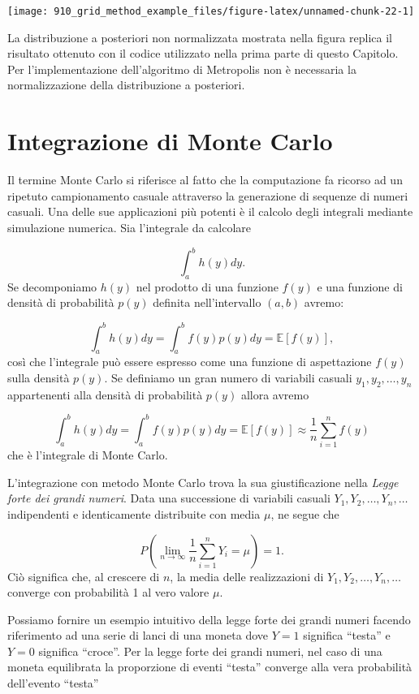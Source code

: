 \documentclass[
]{memoir}
\newcommand{\E}{\mathbb{E}} %
\begin{document}
\begin{center}\texttt{[image: 910\_grid\_method\_example\_files/figure-latex/unnamed-chunk-22-1]} \end{center}

\noindent
La distribuzione a posteriori non normalizzata mostrata nella figura replica il risultato ottenuto con il codice utilizzato nella prima parte di questo Capitolo. Per l'implementazione dell'algoritmo di Metropolis non è necessaria la normalizzazione della distribuzione a posteriori.

\hypertarget{integration-mc}{%
\chapter{Integrazione di Monte Carlo}\label{integration-mc}}

Il termine Monte Carlo si riferisce al fatto che la computazione fa ricorso ad un ripetuto campionamento casuale attraverso la generazione di sequenze di numeri casuali. Una delle sue applicazioni più potenti è il calcolo degli integrali mediante simulazione numerica. Sia l'integrale da calcolare

\[
\int_a^b h(y) dy.
\]
Se decomponiamo \(h(y)\) nel prodotto di una funzione \(f(y)\) e una funzione di densità
di probabilità \(p(y)\) definita nell'intervallo \((a, b)\) avremo:

\[
\int_a^b h(y) dy = \int_a^b f(y) p(y) dy = \E[f(y)],
\]
così che l'integrale può essere espresso come una funzione di aspettazione \(f(y)\) sulla densità \(p(y)\). Se definiamo un gran numero di variabili casuali \(y_1, y_2, \dots, y_n\) appartenenti alla densità di probabilità \(p(y)\) allora avremo

\[
\int_a^b h(y) dy = \int_a^b f(y) p(y) dy = \E[f(y)] \approx \frac{1}{n}\sum_{i=1}^n f(y)
\]
che è l'integrale di Monte Carlo.

L'integrazione con metodo Monte Carlo trova la sua giustificazione nella \emph{Legge forte dei grandi numeri}. Data una successione di variabili casuali \(Y_{1}, Y_{2},\dots, Y_{n},\dots\) indipendenti e identicamente distribuite con media \(\mu\), ne segue che

\[
P\left( \lim_{n \rightarrow \infty} \frac{1}{n} \sum_{i=1}^n Y_i = \mu \right) = 1.
\]
Ciò significa che, al crescere di \(n\), la media delle realizzazioni di \(Y_{1}, Y_{2},\dots, Y_{n},\dots\) converge con probabilità 1 al vero valore \(\mu\).

Possiamo fornire un esempio intuitivo della legge forte dei grandi numeri facendo riferimento ad una serie di lanci di una moneta dove \(Y=1\) significa ``testa'' e \(Y=0\) significa ``croce''. Per la legge forte dei grandi numeri, nel caso di una moneta equilibrata la proporzione di eventi ``testa'' converge alla vera probabilità dell'evento ``testa''
\end{document}
